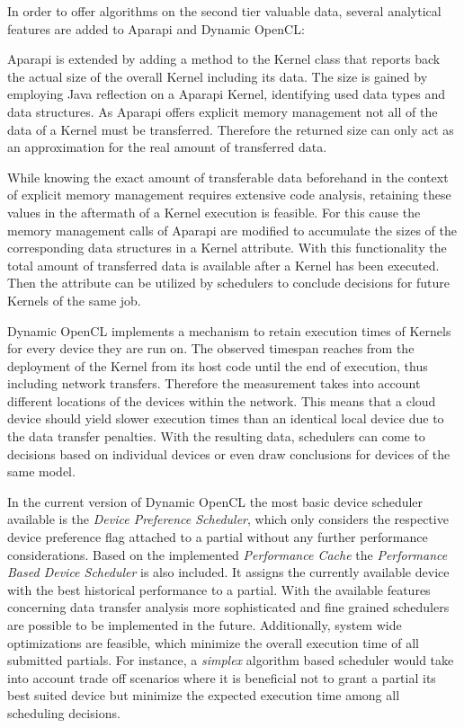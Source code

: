 In order to offer algorithms on the second tier valuable data, several analytical features are added to Aparapi and Dynamic OpenCL:
\begin{description}[style=nextline]
	\item[Kernel Data Size]
	Aparapi is extended by adding a method to the Kernel class that reports back the actual size of the overall Kernel including its data. The size is gained by employing Java reflection on a Aparapi Kernel, identifying used data types and data structures. As Aparapi offers explicit memory management not all of the data of a Kernel must be transferred. Therefore the returned size can only act as an approximation for the real amount of transferred data.
	\item[Historical Data Transfer]
	While knowing the exact amount of transferable data beforehand in the context of explicit memory management requires extensive code analysis, retaining these values in the aftermath of a Kernel execution is feasible. For this cause the memory management calls of Aparapi are modified to accumulate the sizes of the corresponding data structures in a Kernel attribute. With this functionality the total amount of transferred data is available after a Kernel has been executed. Then the attribute can be utilized by schedulers to conclude decisions for future Kernels of the same job.
	\item[Performance Cache]
	Dynamic OpenCL implements a mechanism to retain execution times of Kernels for every device they are run on. The observed timespan reaches from the deployment of the Kernel from its host code until the end of execution, thus including network transfers. Therefore the measurement takes into account different locations of the devices within the network. This means that a cloud device should yield slower execution times than an identical local device due to the data transfer penalties. With the resulting data, schedulers can come to decisions based on individual devices or even draw conclusions for devices of the same model.
\end{description}

In the current version of Dynamic OpenCL the most basic device scheduler available is the \textit{Device Preference Scheduler}, which only considers the respective device preference flag attached to a partial without any further performance considerations.
Based on the implemented \textit{Performance Cache} the \textit{Performance Based Device Scheduler} is also included. It assigns the currently available device with the best historical performance to a partial. With the available features concerning data transfer analysis more sophisticated and fine grained schedulers are possible to be implemented in the future. Additionally, system wide optimizations are feasible, which minimize the overall execution time of all submitted partials. For instance, a \textit{simplex} algorithm based scheduler would take into account trade off scenarios where it is beneficial not to grant a partial its best suited device but minimize the expected execution time among all scheduling decisions.


